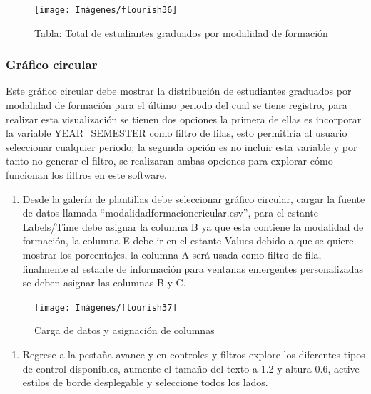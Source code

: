 \documentclass[
]{book}
\providecommand{\tightlist}{%
  \setlength{\itemsep}{0pt}\setlength{\parskip}{0pt}}
\begin{document}
\begin{figure}

{\centering \texttt{[image: Imágenes/flourish36]} 

}

\caption{Tabla: Total de estudiantes graduados por modalidad de formación}\label{fig:tablatextomodalidadfromacionflourish-fig}
\end{figure}

\hypertarget{graficocircularflourish}{%
\subsubsection{Gráfico circular}\label{graficocircularflourish}}

Este gráfico circular debe mostrar la distribución de estudiantes graduados por modalidad de formación para el último periodo del cual se tiene registro, para realizar esta visualización se tienen dos opciones la primera de ellas es incorporar la variable YEAR\_SEMESTER como filtro de filas, esto permitiría al usuario seleccionar cualquier periodo; la segunda opción es no incluir esta variable y por tanto no generar el filtro, se realizaran ambas opciones para explorar cómo funcionan los filtros en este software.

\begin{enumerate}
\def\labelenumi{\arabic{enumi}.}
\tightlist
\item
  Desde la galería de plantillas debe seleccionar gráfico circular, cargar la fuente de datos llamada ``modalidadformacioncricular.csv'', para el estante Labels/Time debe asignar la columna B ya que esta contiene la modalidad de formación, la columna E debe ir en el estante Values debido a que se quiere mostrar los porcentajes, la columna A será usada como filtro de fila, finalmente al estante de información para ventanas emergentes personalizadas se deben asignar las columnas B y C.
\end{enumerate}

\begin{figure}

{\centering \texttt{[image: Imágenes/flourish37]} 

}

\caption{Carga de datos y asignación de columnas}\label{fig:paso1graficocircularflourish-fig}
\end{figure}

\begin{enumerate}
\def\labelenumi{\arabic{enumi}.}
\setcounter{enumi}{1}
\tightlist
\item
  Regrese a la pestaña avance y en controles y filtros explore los diferentes tipos de control disponibles, aumente el tamaño del texto a 1.2 y altura 0.6, active estilos de borde desplegable y seleccione todos los lados.
\end{enumerate}
\end{document}
